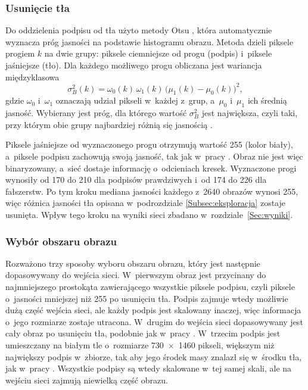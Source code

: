 \documentclass[12pt, twoside, openright]{article}
\begin{document}
\subsubsection*{Usunięcie tła}

Do oddzielenia podpisu od tła użyto metody Otsu \cite{otsu1979}, która automatycznie wyznacza próg jasności na podstawie histogramu obrazu.
Metoda dzieli piksele progiem $k$ na dwie grupy: piksele ciemniejsze od progu (podpis) i~piksele jaśniejsze (tło).
Dla każdego możliwego progu obliczana jest wariancja międzyklasowa
\begin{equation}
	\sigma_B^2(k) = \omega_0(k)\,\omega_1(k)\,\big(\mu_1(k) - \mu_0(k)\big)^2,
	\label{Eq:otsu}
\end{equation}
gdzie $\omega_0$ i~$\omega_1$ oznaczają udział pikseli w~każdej z~grup, a~$\mu_0$ i~$\mu_1$ ich średnią jasność.
Wybierany jest próg, dla którego wartość $\sigma_B^2$ jest największa, czyli taki, przy którym obie grupy najbardziej różnią się jasnością \cite{otsu1979}.

Piksele jaśniejsze od wyznaczonego progu otrzymują wartość 255 (kolor biały), a~piksele podpisu zachowują swoją jasność, tak jak w~pracy \cite{hafemann2017features}.
Obraz nie jest więc binaryzowany, a~sieć dostaje informację o~odcieniach kresek.
Wyznaczone progi wynosiły od 170 do 210 dla podpisów prawdziwych i~od 174 do 226 dla fałszerstw.
Po tym kroku mediana jasności każdego z~2640 obrazów wynosi 255, więc różnica jasności tła opisana w~podrozdziale \ref{Subsec:eksploracja} zostaje usunięta.
Wpływ tego kroku na wyniki sieci zbadano w~rozdziale~\ref{Sec:wyniki}.

\subsubsection*{Wybór obszaru obrazu}

Rozważono trzy sposoby wyboru obszaru obrazu, który jest następnie dopasowywany do wejścia sieci.
W~pierwszym obraz jest przycinany do najmniejszego prostokąta zawierającego wszystkie piksele podpisu, czyli piksele o~jasności mniejszej niż 255 po usunięciu tła.
Podpis zajmuje wtedy możliwie dużą część wejścia sieci, ale każdy podpis jest skalowany inaczej, więc informacja o~jego rozmiarze zostaje utracona.
W~drugim do wejścia sieci dopasowywany jest cały obraz po usunięciu tła, podobnie jak w~pracy \cite{dey2017}.
W~trzecim podpis jest umieszczany na białym tle o~rozmiarze 730~$\times$~1460 pikseli, większym niż największy podpis w~zbiorze, tak aby jego środek masy znalazł się w~środku tła, jak w~pracy \cite{hafemann2017features}.
Wszystkie podpisy są wtedy skalowane w~tej samej skali, ale na wejściu sieci zajmują niewielką część obrazu.
\end{document}
